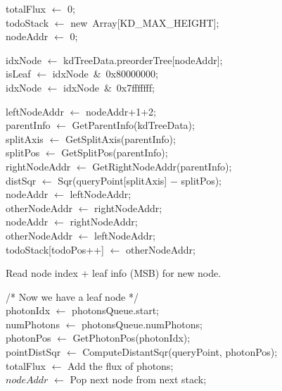\begin{algorithm}
	\SetAlgoLined

	totalFlux \(\leftarrow\) 0; \\
	todoStack \(\leftarrow\) new\ Array[KD\_MAX\_HEIGHT]; \\
	nodeAddr \(\leftarrow\) 0; \\

	 {

		idxNode \(\leftarrow\) kdTreeData.preorderTree[nodeAddr]; \\
		isLeaf \(\leftarrow\) idxNode\ \&\ 0x80000000; \\
		idxNode \(\leftarrow\) idxNode\ \&\ 0x7fffffff; \\
		
		 {
			leftNodeAddr \(\leftarrow\) nodeAddr+1+2; \\
		
			parentInfo \(\leftarrow\) GetParentInfo(kdTreeData); \\
			splitAxis \(\leftarrow\) GetSplitAxis(parentInfo); \\
			splitPos \(\leftarrow\) GetSplitPos(parentInfo); \\
			rightNodeAddr \(\leftarrow\) GetRightNodeAddr(parentInfo); \\
		
			distSqr \(\leftarrow\) Sqr(queryPoint[splitAxis] \(-\) splitPos); \\
			
			nodeAddr \(\leftarrow\) leftNodeAddr; \\
			otherNodeAddr \(\leftarrow\) rightNodeAddr; \\
			 {
				nodeAddr \(\leftarrow\) rightNodeAddr; \\
				otherNodeAddr \(\leftarrow\) leftNodeAddr; \\
			}
			 {
				todoStack[todoPos++] \(\leftarrow\) otherNodeAddr; \\
			}
			
			Read node index + leaf info (MSB) for new node. \\
		}
		
		/* Now we have a leaf node */ \\
		photonIdx \(\leftarrow\) photonsQueue.start; \\
		numPhotons \(\leftarrow\) photonsQueue.numPhotons; \\
		 {
			photonPos \(\leftarrow\) GetPhotonPos(photonIdx); \\
			pointDistSqr \(\leftarrow\) ComputeDistantSqr(queryPoint, photonPos); \\
			 {
				totalFlux \(\leftarrow\) Add the flux of photons; \\
			}
		}
		\(nodeAddr\) \(\leftarrow\) Pop next node from next stack; \\	
	}	
	

\end{algorithm}
